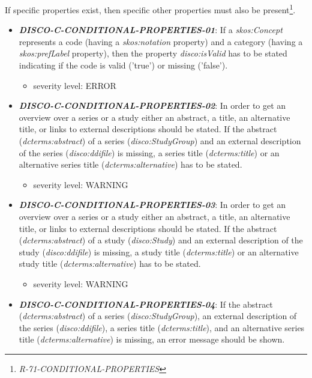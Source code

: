 \documentclass{llncs}
\begin{document}
If specific properties exist, then specific other properties must also be present\footnote{{\em R-71-CONDITIONAL-PROPERTIES}}.

\begin{itemize}
	\item \textbf{{\em DISCO-C-CONDITIONAL-PROPERTIES-01}}:
  If a {\em skos:Concept} represents a code (having a {\em skos:notation} property) and a category (having a {\em skos:prefLabel} property), 
then the property {\em disco:isValid} has to be stated indicating if the code is valid ('true') or missing ('false').
	\begin{itemize}
		\item severity level: ERROR
	\end{itemize}
	\item \textbf{{\em DISCO-C-CONDITIONAL-PROPERTIES-02}}:
	In order to get an overview over a series or a study either an abstract, a title, an alternative title, or links to external descriptions should be stated. 
	If the abstract (\emph{dcterms:abstract}) of a series (\emph{disco:StudyGroup}) and an external description of the series (\emph{disco:ddifile}) is missing, 
	a series title (\emph{dcterms:title}) or an alternative series title (\emph{dcterms:alternative}) has to be stated.
	\begin{itemize}
		\item severity level: WARNING
	\end{itemize}
	\item \textbf{{\em DISCO-C-CONDITIONAL-PROPERTIES-03}}:
	In order to get an overview over a series or a study either an abstract, a title, an alternative title, or links to external descriptions should be stated. 
	If the abstract (\emph{dcterms:abstract}) of a study (\emph{disco:Study}) and an external description of the study (\emph{disco:ddifile}) is missing, 
	a study title (\emph{dcterms:title}) or an alternative study title (\emph{dcterms:alternative}) has to be stated.
	\begin{itemize}
		\item severity level: WARNING
	\end{itemize}
	\item \textbf{{\em DISCO-C-CONDITIONAL-PROPERTIES-04}}:
	If the abstract (\emph{dcterms:abstract}) of a series (\emph{disco:StudyGroup}), an external description of the series (\emph{disco:ddifile}), 
	a series title (\emph{dcterms:title}), and an alternative series title (\emph{dcterms:alternative}) is missing, an error message should be shown.
	\begin{itemize}

\end{itemize}
\end{itemize}
\end{document}
